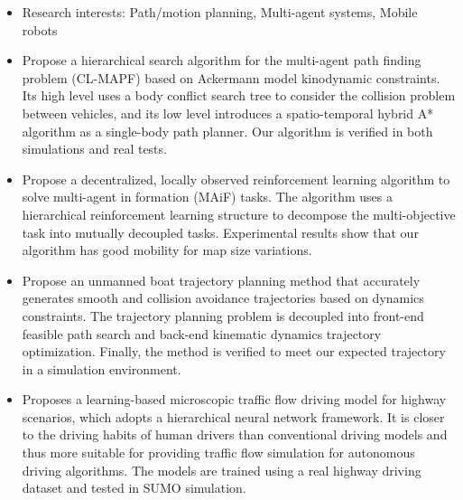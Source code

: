
{\small
  \begin{itemize}
    \item Research interests: Path/motion planning, Multi-agent systems, Mobile robots
    \item Propose a hierarchical search algorithm for the multi-agent path finding problem (CL-MAPF) based on Ackermann model kinodynamic constraints. Its high level uses a body conflict search tree to consider the collision problem between vehicles, and its low level introduces a spatio-temporal hybrid A* algorithm as a single-body path planner. Our algorithm is verified in both simulations and real tests.
    \item Propose a decentralized, locally observed reinforcement learning algorithm to solve multi-agent in formation (MAiF) tasks. The algorithm uses a hierarchical reinforcement learning structure to decompose the multi-objective task into mutually decoupled tasks. Experimental results show that our algorithm has good mobility for map size variations.

    \item Propose an unmanned boat trajectory planning method that accurately generates smooth and collision avoidance trajectories based on dynamics constraints. The trajectory planning problem is decoupled into front-end feasible path search and back-end kinematic dynamics trajectory optimization. Finally, the method is verified to meet our expected trajectory in a simulation environment.
    \item Proposes a learning-based microscopic traffic flow driving model for highway scenarios, which adopts a hierarchical neural network framework. It is closer to the driving habits of human drivers than conventional driving models and thus more suitable for providing traffic flow simulation for autonomous driving algorithms. The models are trained using a real highway driving dataset and tested in SUMO simulation.
  \end{itemize}
}

